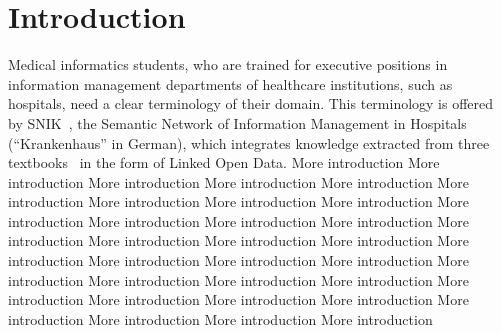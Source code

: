 \documentclass{IOS-Book-Article}     %
\newcommand{\citep}{\cite}%
\begin{document}
\section{Introduction}
Medical informatics students, who are trained for executive positions in information management departments of healthcare institutions, such as hospitals, need a clear terminology of their domain.
This terminology is offered by SNIK~\citep{semantischesnetz,sniktec}, the Semantic Network of Information Management in Hospitals (\enquote{Krankenhaus} in German), which integrates knowledge extracted from three textbooks~\citep{bb,ob,he} in the form of Linked Open Data.
More introduction More introduction More introduction More introduction More introduction More introduction More introduction More introduction More introduction More introduction More introduction 
More introduction More introduction More introduction More introduction More introduction More introduction More introduction More introduction More introduction More introduction More introduction 
More introduction More introduction More introduction More introduction More introduction More introduction More introduction More introduction More introduction More introduction More introduction 
\end{document}
